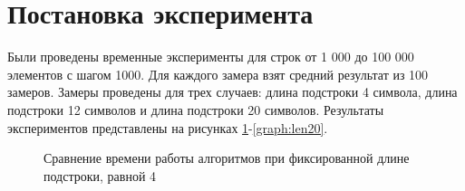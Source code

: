 \documentclass[a4paper,12pt]{report}
\begin{document}
	
%	
        
    \section{Постановка эксперимента} 

		Были проведены временные эксперименты для строк  от 1 000 до 100 000 элементов с шагом 1000. 
		Для каждого замера взят средний результат из 100 замеров.  
		Замеры проведены для трех случаев: длина подстроки 4 символа, длина подстроки 12 символов и длина подстроки 20 символов. 
		Результаты экспериментов представлены на рисунках \ref{graph:len4}-\ref{graph:len20}.

		\begin{figure}[h!]
			\caption{Сравнение времени работы алгоритмов при фиксированной длине подстроки, равной 4}
			\label{graph:len4}
		\end{figure}   
	
		\newpage
	
\end{document}
